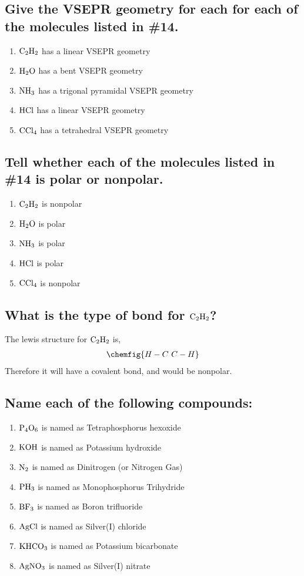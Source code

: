\documentclass[11pt]{article}
\begin{document}
\subsection{Give the VSEPR geometry for each for each of the molecules listed in \#14.}
\label{sec:orga482973}
\begin{enumerate}
\item \(\ce{C2H2}\) has a linear VSEPR geometry
\item \(\ce{H2O}\) has a bent VSEPR geometry
\item \(\ce{NH3}\) has a trigonal pyramidal VSEPR geometry
\item \(\ce{HCl}\) has a linear VSEPR geometry
\item \(\ce{CCl4}\) has a tetrahedral VSEPR geometry
\end{enumerate}

\subsection{Tell whether each of the molecules listed in \#14 is polar or nonpolar.}
\label{sec:org1ad73db}
\begin{enumerate}
\item \(\ce{C2H2}\) is nonpolar
\item \(\ce{H2O}\) is polar
\item \(\ce{NH3}\) is polar
\item \(\ce{HCl}\) is polar
\item \(\ce{CCl4}\) is nonpolar
\end{enumerate}

\subsection{What is the type of bond for \(\ce{C2H2}\)?}
\label{sec:org4914ae3}
The lewis structure for \(\ce{C2H2}\) is,
\begin{align}
\chemfig{{H}-{C}~{C}-{H}}
\end{align}
Therefore it will have a covalent bond, and would be nonpolar.

\subsection{Name each of the following compounds:}
\label{sec:org98e935a}
\begin{enumerate}
\item \(\ce{P4O6}\) is named as Tetraphosphorus hexoxide
\item \(\ce{KOH}\) is named as Potassium hydroxide
\item \(\ce{N2}\) is named as Dinitrogen (or Nitrogen Gas)
\item \(\ce{PH3}\) is named as Monophosphorus Trihydride
\item \(\ce{BF3}\) is named as Boron trifluoride
\item \(\ce{AgCl}\) is named as Silver(I) chloride
\item \(\ce{KHCO3}\) is named as Potassium bicarbonate
\item \(\ce{AgNO3}\) is named as Silver(I) nitrate
\end{enumerate}
\end{document}
